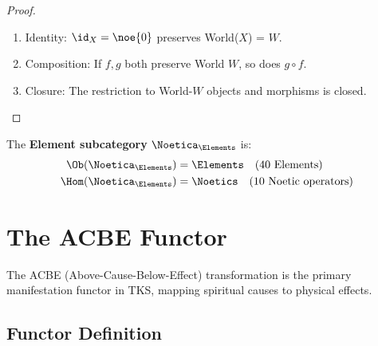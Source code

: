 \begin{proof}
\begin{enumerate}
  \item Identity: $\id_X = \noe{0}$ preserves World($X$) = $W$.
  \item Composition: If $f, g$ both preserve World $W$, so does $g \circ f$.
  \item Closure: The restriction to World-$W$ objects and morphisms is closed.
\end{enumerate}
\end{proof}

\begin{definition}
\label{def:element-subcat}
The \textbf{Element subcategory} $\Noetica_\Elements$ is:
\begin{align}
\Ob(\Noetica_\Elements) &= \Elements \quad \text{(40 Elements)} \\
\Hom(\Noetica_\Elements) &= \Noetics \quad \text{(10 Noetic operators)}
\end{align}
\end{definition}

\chapter{The ACBE Functor}
\label{ch:acbe-functor}

The ACBE (Above-Cause-Below-Effect) transformation is the primary manifestation functor in TKS, mapping spiritual causes to physical effects.

\section{Functor Definition}

